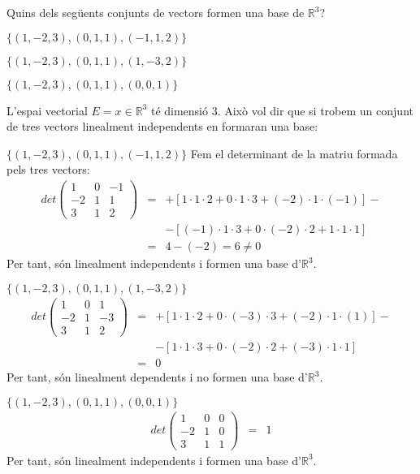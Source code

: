 \Exercise Quins dels següents conjunts de vectors formen una base de $\mathbb{R}^3$?
  \begin{llista}[label=(\alph*)]
    \item $\{(1,-2,3),(0,1,1),(-1,1,2)\}$
    \item $\{(1,-2,3),(0,1,1),(1,-3,2)\}$
    \item $\{(1,-2,3),(0,1,1),(0,0,1)\}$
  \end{llista}

\Answer L'espai vectorial $E={x\in \mathbb{R}^3}$ té dimensió 3. Això vol dir que si trobem un conjunt de tres vectors linealment independents en formaran una base:
\begin{llista}[label=(\alph*)]
  \item $\{(1,-2,3),(0,1,1),(-1,1,2)\}$
  Fem el determinant de la matriu formada pels tres vectors:
  \begin{eqnarray*}
    det \begin{pmatrix}1&0&-1\\-2&1&1\\3&1&2\end{pmatrix}&=&
    +[1\cdot1\cdot2+0\cdot1\cdot3+(-2)\cdot1\cdot(-1)]-\\
    &&-[(-1)\cdot1\cdot3+0\cdot(-2)\cdot2+1\cdot1\cdot1]\\
    &=&4-(-2)=6 \neq 0
  \end{eqnarray*}
  Per tant, són linealment independents i formen una base d'$\mathbb{R}^3$.
  \blacksquare

  \item $\{(1,-2,3),(0,1,1),(1,-3,2)\}$
  \begin{eqnarray*}
    det \begin{pmatrix}1&0&1\\-2&1&-3\\3&1&2\end{pmatrix}&=&
    +[1\cdot1\cdot2+0\cdot(-3)\cdot3+(-2)\cdot1\cdot(1)]-\\
    &&-[1\cdot1\cdot3+0\cdot(-2)\cdot2+(-3)\cdot1\cdot1]\\
    &=&0
  \end{eqnarray*}
  Per tant, són linealment dependents i no formen una base d'$\mathbb{R}^3$.
  \blacksquare

  \item $\{(1,-2,3),(0,1,1),(0,0,1)\}$
  \begin{eqnarray*}
    det \begin{pmatrix}1&0&0\\-2&1&0\\3&1&1\end{pmatrix}&=&
    1
  \end{eqnarray*}
  Per tant, són linealment independents i formen una base d'$\mathbb{R}^3$.
  \blacksquare

\end{llista}
